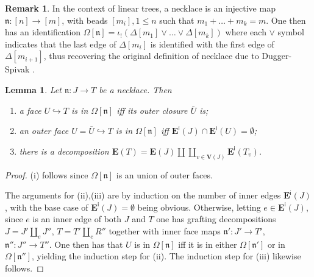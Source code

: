 \documentclass[a4paper,10pt]{article}%
\numberwithin{equation}{section}
\numberwithin{figure}{section}
\newtheorem{lemma}[equation]{Lemma}%
\theoremstyle{definition} %
\newtheorem{remark}[equation]{Remark}%
\newcommand{\1}{\ensuremath{\mathbbm 1}}%
\begin{document}
\begin{remark}
	In the context of linear trees,
	a necklace is an injective map
	$\mathfrak{n} \colon [n] \to [m]$,
	with beads $[m_i], 1 \leq n$
	such that $m_1 + \dots + m_k = m$.
	One then has an identification
	$\Omega[\mathfrak n] =
	\iota_!(\Delta[m_1] \vee \dots \vee \Delta[m_k])$
	where each $\vee$ symbol
	indicates that the last edge of 
	$\Delta[m_i]$ is identified with the first edge of
	$\Delta[m_{i+1}]$,
	thus recovering the original definition of necklace 
	due to Dugger-Spivak \cite[\S 1]{DS11}.
\end{remark}



\begin{lemma}\label{FACEINNECK LEM}
	Let $\mathfrak{n} \colon J \to T$ be a necklace. Then
	\begin{enumerate}[label=(\roman*)]
		\item a face $U \hookrightarrow T$
		is in $\Omega[\mathfrak{n}]$
		iff its outer closure $\bar{U}$ is; 
		\item an outer face 
		$U = \bar{U} \hookrightarrow T$
		is in $\Omega[\mathfrak{n}]$ iff 
		$\boldsymbol{E}^{\mathsf{i}}(J) \cap 
		\boldsymbol{E}^{\mathsf{i}}(U) = \emptyset$;
		\item there is a decomposition
		$
		\boldsymbol{E}(T) = 
		\boldsymbol{E}(J) \amalg 
		\coprod_{v \in \boldsymbol{V}(J)}
		\boldsymbol{E}^{\mathsf{i}}(T_v)
		$.
	\end{enumerate}
\end{lemma}



\begin{proof}
	(i) follows since $\Omega[\mathfrak{n}]$ is an union of outer faces.
	
	The arguments for (ii),(iii) are by induction on the number of inner edges $\boldsymbol{E}^{\mathsf{i}}(J)$,
	with the base case of $\boldsymbol{E}^{\mathsf{i}}(J) = \emptyset$  being obvious.
%	
	Otherwise, letting $e \in \boldsymbol{E}^{\mathsf{i}}(J)$, since $e$ is an inner edge of
	both $J$ and $T$
	one has grafting decompositions
	$J = J' \amalg_e J''$,
	$T = T' \amalg_e R''$
	together with inner face maps
	$\mathfrak{n}' \colon J' \to T'$,
	$\mathfrak{n}'' \colon J'' \to T''$.
%
	One then has that 
	$U$ is in $\Omega[\mathfrak{n}]$
	iff it is in either
	$\Omega[\mathfrak{n}']$ or in $\Omega[\mathfrak{n}'']$,
	yielding the induction step for (ii).
	The induction step for (iii) likewise follows. 
\end{proof}
\end{document}
